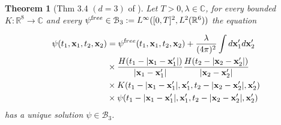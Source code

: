 \documentclass[b5paper,draft,openbib,12pt]{memoir}
\newtheorem{Thm}[Def]{Theorem}
\newcommand{\vx}{\mathbf{x}}
\newcommand{\free}{{\textup free}}
\begin{document}


\begin{Thm}[Thm 3.4 \((d=3)\) of \cite{mtve}]
Let \(T>0, \lambda\in\mathbb{C}\), for every bounded \(K:\mathbb{R}^8\rightarrow\mathbb{C}\) and every
\(\psi^\free \in\mathcal{B}_3:=L^\infty([0,T]^2,L^2(\mathbb{R}^6))\)
the equation 

\begin{align*}
\psi(t_1,\vx_1,t_2,\vx_2)&=\psi^\free(t_1,\vx_1,t_2,\vx_2)+\frac{\lambda}{(4\pi)^2}\int d\vx_1' d\vx_2'\\
&\times \frac{H(t_1-|\vx_1-\vx_1'|)}{|\vx_1-\vx_1'|}\frac{H(t_2-|\vx_2-\vx_2'|)}{|\vx_2-\vx_2'|}\\
&\times K(t_1-|\vx_1-\vx_1'|,\vx_1',t_2-|\vx_2-\vx_2'|,\vx_2')\\
&\times \psi(t_1-|\vx_1-\vx_1'|,\vx_1',t_2-|\vx_2-\vx_2'|,\vx_2')
\end{align*}
has a unique solution \(\psi\in\mathcal{B}_3\).
\end{Thm}
\end{document}
